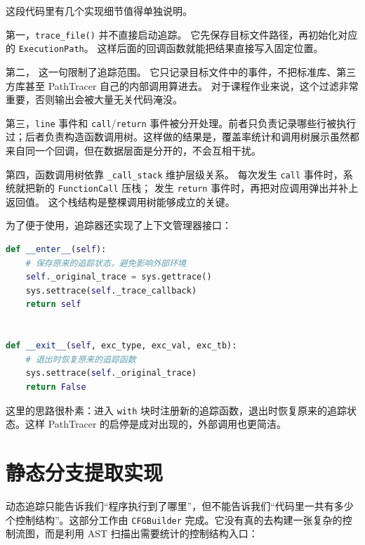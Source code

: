 这段代码里有几个实现细节值得单独说明。

第一，\texttt{trace\_file()} 并不直接启动追踪。%
它先保存目标文件路径，再初始化对应的 \texttt{ExecutionPath}。%
这样后面的回调函数就能把结果直接写入固定位置。

第二， 这一句限制了追踪范围。%
它只记录目标文件中的事件，不把标准库、第三方库甚至 PathTracer 自己的内部调用算进去。%
对于课程作业来说，这个过滤非常重要，否则输出会被大量无关代码淹没。

第三，\texttt{line} 事件和 \texttt{call}/\texttt{return} 事件被分开处理。前者只负责记录哪些行被执行过；后者负责构造函数调用树。这样做的结果是，覆盖率统计和调用树展示虽然都来自同一个回调，但在数据层面是分开的，不会互相干扰。

第四，函数调用树依靠 \texttt{\_call\_stack} 维护层级关系。%
每次发生 \texttt{call} 事件时，系统就把新的 \texttt{FunctionCall} 压栈；%
发生 \texttt{return} 事件时，再把对应调用弹出并补上返回值。%
这个栈结构是整棵调用树能够成立的关键。

为了便于使用，追踪器还实现了上下文管理器接口：

\begin{lstlisting}[language=Python, caption={追踪器的启停方式}]
def __enter__(self):
    # 保存原来的追踪状态，避免影响外部环境
    self._original_trace = sys.gettrace()
    sys.settrace(self._trace_callback)
    return self


def __exit__(self, exc_type, exc_val, exc_tb):
    # 退出时恢复原来的追踪函数
    sys.settrace(self._original_trace)
    return False
\end{lstlisting}

这里的思路很朴素：进入 \texttt{with} 块时注册新的追踪函数，退出时恢复原来的追踪状态。这样 PathTracer 的启停是成对出现的，外部调用也更简洁。

\section{静态分支提取实现}

动态追踪只能告诉我们“程序执行到了哪里”，但不能告诉我们“代码里一共有多少个控制结构”。这部分工作由 \texttt{CFGBuilder} 完成。它没有真的去构建一张复杂的控制流图，而是利用 AST 扫描出需要统计的控制结构入口：

